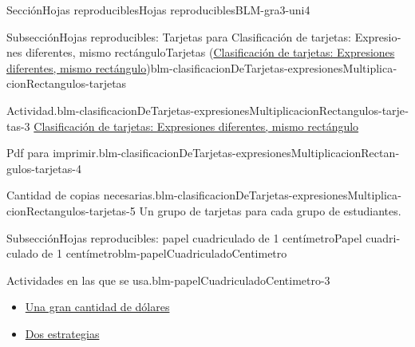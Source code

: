 \documentclass[oneside,10pt,]{article}
\begin{document}
\begin{sectionptx}{Sección}{Hojas reproducibles}{}{Hojas reproducibles}{}{}{BLM-gra3-uni4}
%
%
\typeout{************************************************}
\typeout{************************************************}
%
\begin{spanish}
\begin{subsectionptx}{Subsección}{Hojas reproducibles: Tarjetas para Clasificación de tarjetas: Expresiones diferentes, mismo rectángulo}{}{Tarjetas (\hyperref[act-clasificacionDeTarjetas-expresionesMultiplicacionRectangulos]{Clasificación de tarjetas: Expresiones diferentes, mismo rectángulo})}{}{}{blm-clasificacionDeTarjetas-expresionesMultiplicacionRectangulos-tarjetas}
\begin{paragraphs}{Actividad.}{blm-clasificacionDeTarjetas-expresionesMultiplicacionRectangulos-tarjetas-3}%
\hyperref[act-clasificacionDeTarjetas-expresionesMultiplicacionRectangulos]{Clasificación de tarjetas: Expresiones diferentes, mismo rectángulo}%
\end{paragraphs}%
\begin{paragraphs}{Pdf para imprimir.}{blm-clasificacionDeTarjetas-expresionesMultiplicacionRectangulos-tarjetas-4}%
%
\end{paragraphs}%
\begin{paragraphs}{Cantidad de copias necesarias.}{blm-clasificacionDeTarjetas-expresionesMultiplicacionRectangulos-tarjetas-5}%
Un grupo de tarjetas para cada grupo de estudiantes.%
\end{paragraphs}%
\end{subsectionptx}
\end{spanish}
%
%
\typeout{************************************************}
\typeout{************************************************}
%
\begin{spanish}
\begin{subsectionptx}{Subsección}{Hojas reproducibles: papel cuadriculado de 1 centímetro}{}{Papel cuadriculado de 1 centímetro}{}{}{blm-papelCuadriculadoCentimetro}
\begin{paragraphs}{Actividades en las que se usa.}{blm-papelCuadriculadoCentimetro-3}%
%
\begin{itemize}[label=\textbullet]
\item{}\hyperref[act-granCantidadDolares]{Una gran cantidad de dólares}%
\item{}\hyperref[act-dosEstrategias]{Dos estrategias}%

\end{itemize}
\end{paragraphs}
\end{subsectionptx}
\end{spanish}
\end{sectionptx}
\end{document}
